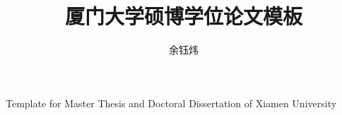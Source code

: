 \author{余钰炜}
\title{厦门大学硕博学位论文模板}
{Template for Master Thesis and Doctoral Dissertation of Xiamen University}

